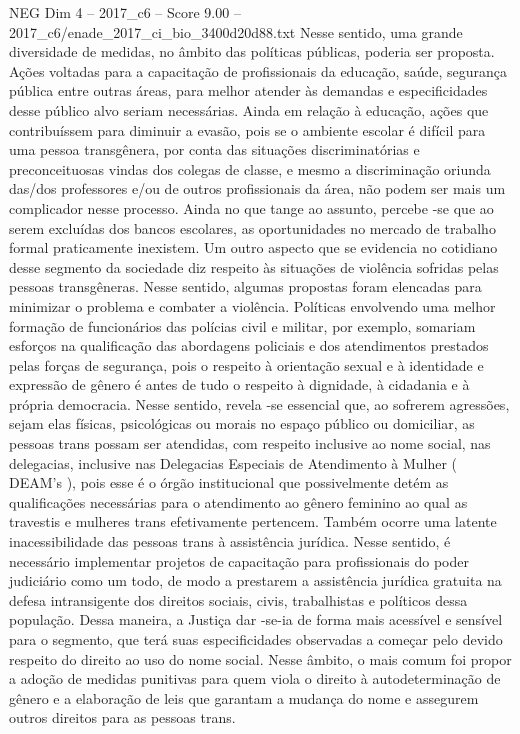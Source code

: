 \begin{textsample}{NEG Dim 4 – 2017\_c6 – Score 9.00 – 2017\_c6/enade\_2017\_ci\_bio\_3400d20d88.txt}
Nesse sentido, uma grande diversidade de medidas, no âmbito das políticas públicas, poderia ser proposta.
Ações voltadas para a capacitação de profissionais da educação, saúde, segurança pública entre outras áreas, para melhor atender às demandas e especificidades desse público alvo seriam necessárias.
Ainda em relação à educação, ações que contribuíssem para diminuir a evasão, pois se o ambiente escolar é difícil para uma pessoa transgênera, por conta das situações discriminatórias e preconceituosas vindas dos colegas de classe, e mesmo a discriminação oriunda das/dos professores e/ou de outros profissionais da área, não podem ser mais um complicador nesse processo.
Ainda no que tange ao assunto, percebe -se que ao serem excluídas dos bancos escolares, as oportunidades no mercado de trabalho formal praticamente inexistem.
Um outro aspecto que se evidencia no cotidiano desse segmento da sociedade diz respeito às situações de violência sofridas pelas pessoas transgêneras.
Nesse sentido, algumas propostas foram elencadas para minimizar o problema e combater a violência.
Políticas envolvendo uma melhor formação de funcionários das polícias civil e militar, por exemplo, somariam esforços na qualificação das abordagens policiais e dos atendimentos prestados pelas forças de segurança, pois o respeito à orientação sexual e à identidade e expressão de gênero é antes de tudo o respeito à dignidade, à cidadania e à própria democracia.
Nesse sentido, revela -se essencial que, ao sofrerem agressões, sejam elas físicas, psicológicas ou morais no espaço público ou domiciliar, as pessoas trans possam ser atendidas, com respeito inclusive ao nome social, nas delegacias, inclusive nas Delegacias Especiais de Atendimento à Mulher ( DEAM’s ), pois esse é o órgão institucional que possivelmente detém as qualificações necessárias para o atendimento ao gênero feminino ao qual as travestis e mulheres trans efetivamente pertencem.
Também ocorre uma latente inacessibilidade das pessoas trans à assistência jurídica.
Nesse sentido, é necessário implementar projetos de capacitação para profissionais do poder judiciário como um todo, de modo a prestarem a assistência jurídica gratuita na defesa intransigente dos direitos sociais, civis, trabalhistas e políticos dessa população.
Dessa maneira, a Justiça dar -se-ia de forma mais acessível e sensível para o segmento, que terá suas especificidades observadas a começar pelo devido respeito do direito ao uso do nome social.
Nesse âmbito, o mais comum foi propor a adoção de medidas punitivas para quem viola o direito à autodeterminação de gênero e a elaboração de leis que garantam a mudança do nome e assegurem outros direitos para as pessoas trans.

\end{textsample}
